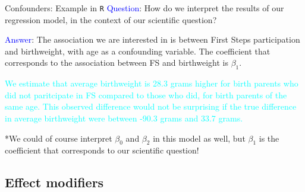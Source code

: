 \documentclass[10pt,t]{beamer}
\begin{document}
\begin{frame}{Confounders: Example in \texttt{R}}
\textcolor{blue}{Question}: How do we interpret the results of our regression model, in the context of our scientific question?

\vspace{0.3cm}

\textcolor{blue}{Answer}: The association we are interested in is between First Steps participation and birthweight, with age as a confounding variable. The coefficient that corresponds to the association between FS and birthweight is $\beta_1$.

\vspace{0.3cm}

\textcolor{cyan}{We estimate that average birthweight is 28.3 grams higher for birth parents who did not paritcipate in FS compared to those who did, for birth parents of the same age. This observed difference would not be surprising if the true difference in average birthweight were between -90.3 grams and  33.7 grams.} \pause

\vspace{0.3cm}

*We could of course interpret $\beta_0$ and $\beta_2$ in this model as well, but $\beta_1$ is the coefficient that corresponds to our scientific question!
\end{frame}

\subsection{Effect modifiers}
\end{document}
